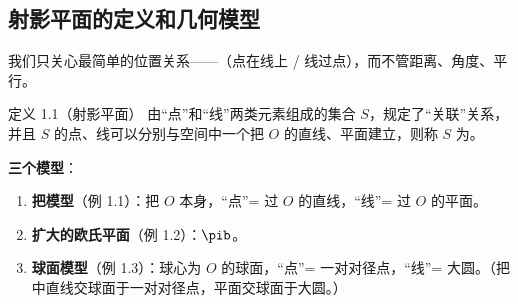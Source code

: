 \subsection{射影平面的定义和几何模型}

我们只关心最简单的位置关系——（点在线上 / 线过点），而不管距离、角度、平行。

\begin{defbox}{定义 1.1（射影平面）}
由“点”和“线”两类元素组成的集合 $S$，规定了“关联”关系，并且 $S$ 的点、线可以分别与空间中一个把 $O$ 的直线、平面建立，则称 $S$ 为。
\end{defbox}

\textbf{三个模型}：
\begin{enumerate}
\item \textbf{把模型}（例 1.1）：把 $O$ 本身，“点”= 过 $O$ 的直线，“线”= 过 $O$ 的平面。
\item \textbf{扩大的欧氏平面}（例 1.2）：$\pib$。
\item \textbf{球面模型}（例 1.3）：球心为 $O$ 的球面，“点”= 一对对径点，“线”= 大圆。（把中直线交球面于一对对径点，平面交球面于大圆。）
\end{enumerate}


